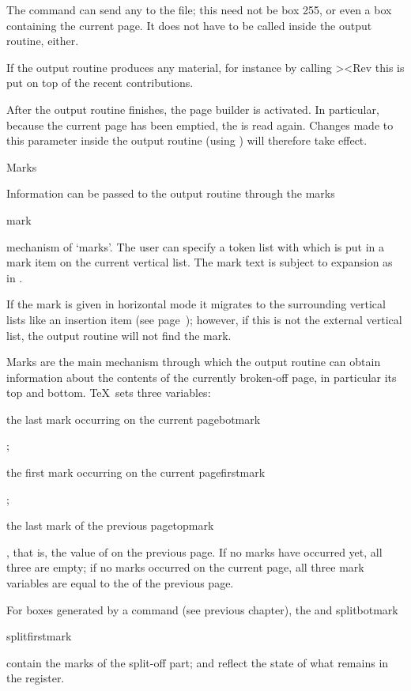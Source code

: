 The  command can send any  to the  file;
this need not be box 255, or even a box
containing the current page.
It does not have to be called inside the output routine, either.

If the output routine produces any material, for instance
by calling \Ver><Rev this is put on top
of the recent contributions.

After the output routine finishes, the page builder is
activated. In particular, because the current page
has been emptied, the  is read again.
Changes made to this parameter inside the output
routine (using ) will therefore take effect.

\point Marks

Information can be passed to the output routine through the
\term marks\par\csterm mark\par
mechanism of `marks'. The user can specify a token list
with \disp{}\lb{}\rb\dispstop
which is put in a mark item on the current vertical list.
The mark text is subject to expansion as in .

If the mark is given in horizontal mode it migrates to
the surrounding vertical lists like an insertion item
(see page~\pgref[migrate]);
however, if this is not the external vertical list, the
output routine will not find the mark.

Marks are the main mechanism through which the output routine
can obtain information about the contents of the currently
broken-off page, in particular its top and bottom.
\TeX\ sets three variables:
\description 
\item {}
   the last mark occurring on the current page\csterm botmark\par;
\item {}
   the first mark occurring on the current page\csterm firstmark\par;
\item {}
   the last mark of the previous page\csterm topmark\par, 
   that is, the value of 
   on the previous page.\descriptionstop
If no marks have occurred yet, all three are empty;
if no marks occurred on the current page, 
all three mark variables are equal
to the  of the previous page.

For boxes generated by a  command (see previous chapter),
the  and 
\csterm splitbotmark\par\csterm splitfirstmark\par
contain the marks of the split-off part; 
and  reflect the state of what remains in the register.

